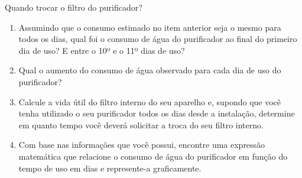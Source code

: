 \begin{task}{Quando trocar o filtro do purificador?}
\begin{enumerate}
\item Assumindo que o consumo estimado no item anterior seja o mesmo para todos os dias, qual foi o consumo de água do purificador ao final do primeiro dia de uso? E entre o 10º e o 11º dias de uso?

\item Qual o aumento do consumo de água observado para cada dia de uso do purificador?

\item Calcule a vida útil do filtro interno do seu aparelho e, supondo que você tenha utilizado o seu purificador todos os dias desde a instalação, determine em quanto tempo você deverá solicitar a troca do seu filtro interno.

\item Com base nas informações que você possui, encontre uma expressão matemática que relacione o consumo de água do purificador em função do tempo de uso em dias e represente-a graficamente.
\end{enumerate}

\end{task}


\label{\detokenize{AF107-4:sec-funcao-afim}}\label{\detokenize{AF107-4::doc}}\label{\detokenize{AF107-4:explorando-funcao-afim}}

